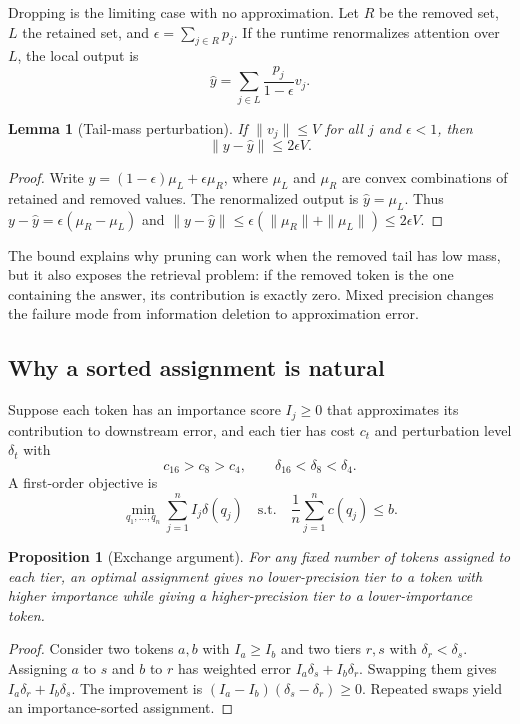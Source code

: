 \documentclass[11pt]{article}
\newcommand{\budget}{b}
\theoremstyle{plain}
\newtheorem{lemma}{Lemma}
\newtheorem{proposition}{Proposition}
\theoremstyle{definition}
\begin{document}
Dropping is the limiting case with no approximation.  Let $R$ be the removed set, $L$ the retained set, and $\epsilon=\sum_{j\in R}p_j$.  If the runtime renormalizes attention over $L$, the local output is
\begin{equation}
  \hat y=\sum_{j\in L}\frac{p_j}{1-\epsilon}v_j .
\end{equation}

\begin{lemma}[Tail-mass perturbation]
If $\|v_j\|\le V$ for all $j$ and $\epsilon<1$, then
\begin{equation}
  \|y-\hat y\|\le 2\epsilon V .
\end{equation}
\end{lemma}
\begin{proof}
Write $y=(1-\epsilon)\mu_L+\epsilon\mu_R$, where $\mu_L$ and $\mu_R$ are convex combinations of retained and removed values.  The renormalized output is $\hat y=\mu_L$.  Thus $y-\hat y=\epsilon(\mu_R-\mu_L)$ and $\|y-\hat y\|\le \epsilon(\|\mu_R\|+\|\mu_L\|)\le 2\epsilon V$.
\end{proof}

The bound explains why pruning can work when the removed tail has low mass, but it also exposes the retrieval problem: if the removed token is the one containing the answer, its contribution is exactly zero.  Mixed precision changes the failure mode from information deletion to approximation error.

\subsection{Why a sorted assignment is natural}
Suppose each token has an importance score $I_j\ge 0$ that approximates its contribution to downstream error, and each tier has cost $c_t$ and perturbation level $\delta_t$ with
\begin{equation}
 c_{16}>c_8>c_4,
 \qquad
 \delta_{16}<\delta_8<\delta_4 .
\end{equation}
A first-order objective is
\begin{equation}
  \min_{q_1,\ldots,q_n}\sum_{j=1}^{n} I_j\delta(q_j)
  \quad\text{s.t.}\quad
  \frac{1}{n}\sum_{j=1}^{n}c(q_j)\le \budget .
  \label{eq:assignment}
\end{equation}

\begin{proposition}[Exchange argument]
For any fixed number of tokens assigned to each tier, an optimal assignment gives no lower-precision tier to a token with higher importance while giving a higher-precision tier to a lower-importance token.
\end{proposition}
\begin{proof}
Consider two tokens $a,b$ with $I_a\ge I_b$ and two tiers $r,s$ with $\delta_r<\delta_s$.  Assigning $a$ to $s$ and $b$ to $r$ has weighted error $I_a\delta_s+I_b\delta_r$.  Swapping them gives $I_a\delta_r+I_b\delta_s$.  The improvement is $(I_a-I_b)(\delta_s-\delta_r)\ge 0$.  Repeated swaps yield an importance-sorted assignment.
\end{proof}
\end{document}
